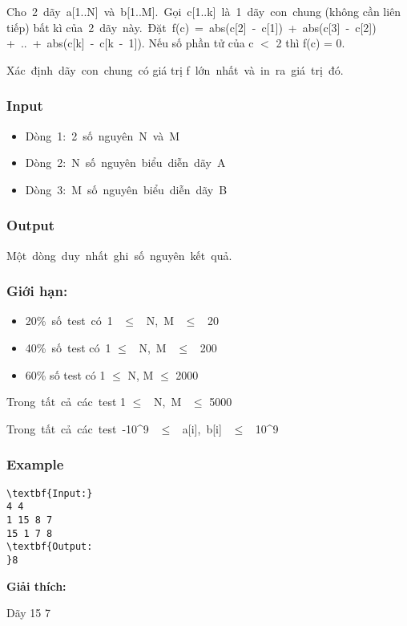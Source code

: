 

Cho 2 dãy a[1..N] và b[1..M]. Gọi c[1..k] là 1 dãy con chung (không cần liên tiếp) bất kì của 2 dãy này. Đặt f(c) = abs(c[2] - c[1]) + abs(c[3] - c[2]) + .. + abs(c[k] - c[k - 1]). Nếu số phần tử của c $<$ 2 thì f(c) = 0.

Xác định dãy con chung có giá trị f lớn nhất và in ra giá trị đó.

\subsubsection{Input}
\begin{itemize}
	\item Dòng 1: 2 số nguyên N và M
	\item Dòng 2: N số nguyên biểu diễn dãy A
	\item Dòng 3: M số nguyên biểu diễn dãy B
\end{itemize}

\subsubsection{Output}

Một dòng duy nhất ghi số nguyên kết quả.

\subsubsection{Giới hạn:}
\begin{itemize}
	\item 20\% số test có 1  $\le$  N, M  $\le$  20
	\item 40\% số test có 1  $\le$  N, M  $\le$  200
	\item 60\% số test có 1  $\le$  N, M  $\le$  2000
\end{itemize}

Trong tất cả các test 1 $\le$  N, M  $\le$  5000

Trong tất cả các test -10^9  $\le$  a[i], b[i]  $\le$  10^9

\subsubsection{Example}
\begin{verbatim}
\textbf{Input:} 
4 4
1 15 8 7
15 1 7 8 
\textbf{Output:
}8\end{verbatim}

\textbf{Giải thích:}

Dãy 15 7
